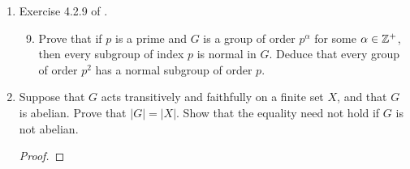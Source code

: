 \documentclass[../psets.tex]{subfiles}
\begin{document}
\begin{enumerate}
\begin{enumerate}[label={\textbf{\arabic*.}}]
\begin{enumerate}[label={\textbf{(\alph*)}}]
\begin{proof}
                Let $G$ a transitive permutation group on $A$ be doubly transitive. To prove that $G$ is primitive, it will suffice to show that the only blocks in $A$ are the trivial ones. Let $B\subset A$ be an arbitrary block. We divide into two cases ($B=A$ and $B\neq A$). If $B=A$, then we are done. If $B\neq A$, then we can pick $c\in A\setminus B$. Additionally, since $B$ (as a block) is nonempty, we may pick an $a\in B$. Now suppose for the sake of contradiction that there exists $b\in B$ such that $b\neq a$. Then since $G_a$ is transitive on $A\setminus\{a\}$, there exists $\sigma\in G_a$ such that $\sigma(b)=c$. This implies that $\sigma(B)\supsetneq B$. However, since $G_a\leq G_B$ by Exercise 7a, $\sigma(B)=B$, a contradiction. Therefore, $B=\{a\}$, as desired.\par
                Since $D_8$ acting on the four vertices of a square is not primitive by Exercise 7c, we have by the above argument that it cannot be doubly transitive in action on this set either, as desired.
            \end{proof}
        \end{enumerate}
    \end{enumerate}
    \item Exercise 4.2.9 of \textcite{bib:DummitFoote}.
    \begin{enumerate}[label={\textbf{\arabic*.}}]
        \setcounter{enumii}{8}
        \item Prove that if $p$ is a prime and $G$ is a group of order $p^\alpha$ for some $\alpha\in\mathbb{Z}^+$, then every subgroup of index $p$ is normal in $G$. Deduce that every group of order $p^2$ has a normal subgroup of order $p$.
    \end{enumerate}
    \item Suppose that $G$ acts transitively and faithfully on a finite set $X$, and that $G$ is abelian. Prove that $|G|=|X|$. Show that the equality need not hold if $G$ is not abelian.
    \begin{proof}



\end{proof}
\end{enumerate}
\end{document}
